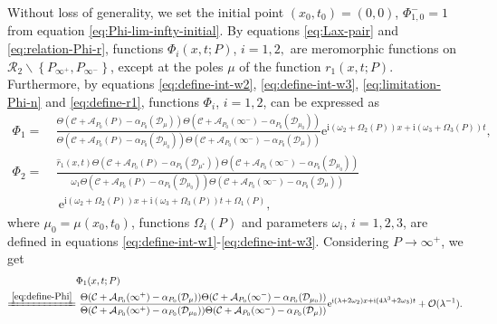 \documentclass[11pt,reqno]{amsart}
\newcommand{\ii}{\mathrm{i}}
\newcommand{\ee}{\mathrm{e}}
\numberwithin{equation}{section}
\begin{document}
Without loss of generality, we set the initial point $(x_0,t_0)=(0,0)$, $\Phi_{1,0}^{-}=1$ from equation \eqref{eq:Phi-lim-infty-initial}.
By equations \eqref{eq:Lax-pair} and \eqref{eq:relation-Phi-r}, functions $\Phi_{i}(x,t;P)$, $i=1,2,$ are meromorphic functions on $\mathcal{R}_2\backslash\left\{P_{\infty^{+}},P_{\infty^{-}}\right\}$, except at the poles $\mu$ of the function $r_1(x,t;P)$.
Furthermore, by equations \eqref{eq:define-int-w2}, \eqref{eq:define-int-w3}, \eqref{eq:limitation-Phi-n} and \eqref{eq:define-r1}, functions $\Phi_{i}$, $i=1,2$, can be expressed as
\begin{equation}\label{eq:define-Phi}
	\begin{split}
		\Phi_{1}
		= & \ \frac{\Theta(\mathcal{C}+\mathcal{A}_{P_0}(P)-\alpha_{P_0}(\mathcal{D}_{\mu}))\Theta(\mathcal{C}+\mathcal{A}_{P_0}(\infty^{-})-\alpha_{P_0}(\mathcal{D}_{\mu_0}))}{\Theta(\mathcal{C}+\mathcal{A}_{P_0}(P)-\alpha_{P_0}(\mathcal{D}_{\mu_0}))\Theta(\mathcal{C}+\mathcal{A}_{P_0}(\infty^{-})-\alpha_{P_0}(\mathcal{D}_{\mu}))}
		\ee^{\ii \left(\omega_2+ \Omega_2(P) \right)x+\ii\left(\omega_3+ \Omega_3(P)\right)t},\\
		\Phi_{2}
		= & \  \frac{\hat{r}_1(x,t)\Theta(\mathcal{C}+\mathcal{A}_{P_0}(P)-\alpha_{P_0}(\mathcal{D}_{\mu^*}))\Theta(\mathcal{C}+\mathcal{A}_{P_0}(\infty^{-})-\alpha_{P_0}(\mathcal{D}_{\mu_0}))}{\omega_1\Theta(\mathcal{C}+\mathcal{A}_{P_0}(P)-\alpha_{P_0}(\mathcal{D}_{\mu_0}))\Theta(\mathcal{C}+\mathcal{A}_{P_0}(\infty^{-})-\alpha_{P_0}(\mathcal{D}_{\mu}))}\\
		& \ \ 
		\ee^{\ii \left(\omega_2+\Omega_2(P) \right)x+\ii\left(\omega_3+\Omega_3(P) \right)t+\Omega_1(P)},
	\end{split}
\end{equation}
where $\mu_0=\mu(x_0,t_0)$, functions $\Omega_{i}(P)$ and parameters $\omega_i$, $i=1,2,3$, are defined in equations \eqref{eq:define-int-w1}-\eqref{eq:define-int-w3}.
Considering $P\rightarrow \infty^{+}$, we get 
\begin{equation}\nonumber
	\begin{split}
		& \Phi_{1}(x,t;P) \\
		\xlongequal{\eqref{eq:define-Phi}} &  \  \frac{\Theta(\mathcal{C}+\mathcal{A}_{P_0}(\infty^{+})-\alpha_{P_0}(\mathcal{D}_{\mu}))\Theta(\mathcal{C}+\mathcal{A}_{P_0}(\infty^{-})-\alpha_{P_0}(\mathcal{D}_{\mu_0}))}{\Theta(\mathcal{C}+\mathcal{A}_{P_0}(\infty^{+})-\alpha_{P_0}(\mathcal{D}_{\mu_0}))\Theta(\mathcal{C}+\mathcal{A}_{P_0}(\infty^{-})-\alpha_{P_0}(\mathcal{D}_{\mu}))}\ee^{\ii (\lambda+2\omega_2 )x+\ii (4\lambda^3+ 2 \omega_3 )t}
		+\mathcal{O}(\lambda^{-1}).
	\end{split}
\end{equation}
\end{document}
